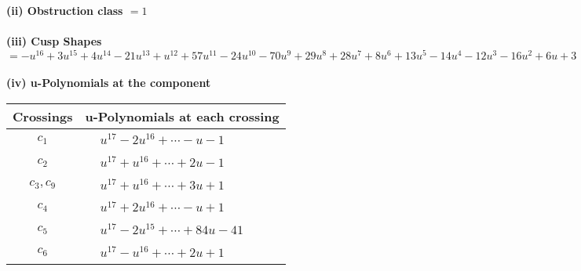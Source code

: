 \documentclass[1p]{elsarticle_modified}
\theoremstyle{definition}
\begin{document}
\flushleft \textbf{(ii) Obstruction class $= 1$}\\~\\
\flushleft \textbf{(iii) Cusp Shapes $= - u^{16}+3 u^{15}+4 u^{14}-21 u^{13}+u^{12}+57 u^{11}-24 u^{10}-70 u^9+29 u^8+28 u^7+8 u^6+13 u^5-14 u^4-12 u^3-16 u^2+6 u+3$}\\~\\
\newpage\renewcommand{\arraystretch}{1}
\flushleft \textbf{(iv) u-Polynomials at the component}\newline \\
\begin{tabular}{m{50pt}|m{274pt}}
Crossings & \hspace{64pt}u-Polynomials at each crossing \\
\hline $$\begin{aligned}c_{1}\end{aligned}$$&$\begin{aligned}
&u^{17}-2 u^{16}+\cdots- u-1
\end{aligned}$\\
\hline $$\begin{aligned}c_{2}\end{aligned}$$&$\begin{aligned}
&u^{17}+u^{16}+\cdots+2 u-1
\end{aligned}$\\
\hline $$\begin{aligned}c_{3},c_{9}\end{aligned}$$&$\begin{aligned}
&u^{17}+u^{16}+\cdots+3 u+1
\end{aligned}$\\
\hline $$\begin{aligned}c_{4}\end{aligned}$$&$\begin{aligned}
&u^{17}+2 u^{16}+\cdots- u+1
\end{aligned}$\\
\hline $$\begin{aligned}c_{5}\end{aligned}$$&$\begin{aligned}
&u^{17}-2 u^{15}+\cdots+84 u-41
\end{aligned}$\\
\hline $$\begin{aligned}c_{6}\end{aligned}$$&$\begin{aligned}
&u^{17}- u^{16}+\cdots+2 u+1
\end{aligned}$\\

\end{tabular}
\end{document}
